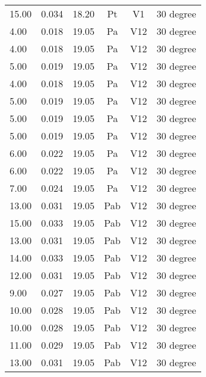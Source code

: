 \begin{table}[t]
\begin{tabular}{l | l | l | c | c | l}
15.00          & 0.034           & 18.20  & Pt       & V1     & 30 degree           \\
4.00           & 0.018           & 19.05  & Pa       & V12    & 30 degree           \\
4.00           & 0.018           & 19.05  & Pa       & V12    & 30 degree           \\
5.00           & 0.019           & 19.05  & Pa       & V12    & 30 degree           \\
4.00           & 0.018           & 19.05  & Pa       & V12    & 30 degree           \\
5.00           & 0.019           & 19.05  & Pa       & V12    & 30 degree           \\
5.00           & 0.019           & 19.05  & Pa       & V12    & 30 degree           \\
5.00           & 0.019           & 19.05  & Pa       & V12    & 30 degree           \\
6.00           & 0.022           & 19.05  & Pa       & V12    & 30 degree           \\
6.00           & 0.022           & 19.05  & Pa       & V12    & 30 degree           \\
7.00           & 0.024           & 19.05  & Pa       & V12    & 30 degree           \\
13.00          & 0.031           & 19.05  & Pab      & V12    & 30 degree           \\
15.00          & 0.033           & 19.05  & Pab      & V12    & 30 degree           \\
13.00          & 0.031           & 19.05  & Pab      & V12    & 30 degree           \\
14.00          & 0.033           & 19.05  & Pab      & V12    & 30 degree           \\
12.00          & 0.031           & 19.05  & Pab      & V12    & 30 degree           \\
9.00           & 0.027           & 19.05  & Pab      & V12    & 30 degree           \\
10.00          & 0.028           & 19.05  & Pab      & V12    & 30 degree           \\
10.00          & 0.028           & 19.05  & Pab      & V12    & 30 degree           \\
11.00          & 0.029           & 19.05  & Pab      & V12    & 30 degree           \\
13.00          & 0.031           & 19.05  & Pab      & V12    & 30 degree           \\
\end{tabular}
\end{table}

